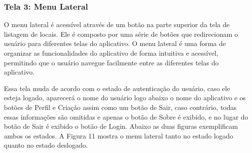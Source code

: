     \FloatBarrier

\subsubsection{Tela 3: Menu Lateral}

    O menu lateral é acessível através de um botão na parte superior da tela de listagem de locais. Ele é composto por uma série de botões que redirecionam o usuário para diferentes telas do aplicativo. O menu lateral é uma forma de organizar as funcionalidades do aplicativo de forma intuitiva e acessível, permitindo que o usuário navegue facilmente entre as diferentes telas do aplicativo.

    Essa tela muda de acordo com o estado de autenticação do usuário, caso ele esteja logado, aparecerá o nome do usuário logo abaixo o nome do aplicativo e os botões de Perfil e Criação assim como um botão de Sair, caso contrário, todas essas informações são omitidas e apenas o botão de Sobre é exibido, e no lugar do botão de Sair é exibido o botão de Login. Abaixo as duas figuras exemplificam ambos os estados. A Figura 11 mostra o menu lateral tanto no estado logado quanto no estado deslogado.

